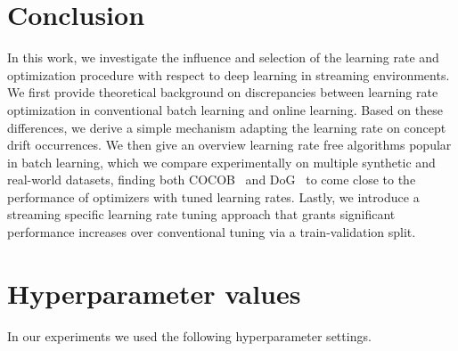 \documentclass[letterpaper]{article} %
\begin{document}



\section{Conclusion}

In this work, we investigate the influence and selection of the learning rate and optimization procedure with respect to deep learning in streaming environments.
We first provide theoretical background on discrepancies between learning rate optimization in conventional batch learning and online learning.
Based on these differences, we derive a simple mechanism adapting the learning rate on concept drift occurrences.
We then give an overview learning rate free algorithms popular in batch learning, which we compare experimentally on multiple synthetic and real-world datasets,
finding both COCOB~\cite{orabonaTrainingDeepNetworks2017} and DoG~\cite{ivgiDoGSGDBest2023} to come close to the performance of optimizers with tuned learning rates.
Lastly, we introduce a streaming specific learning rate tuning approach that grants significant performance increases over conventional tuning via a train-validation split.





\newpage
\appendix

\section{Hyperparameter values}\label{app:hyperparams}

In our experiments we used the following hyperparameter settings.
\end{document}
